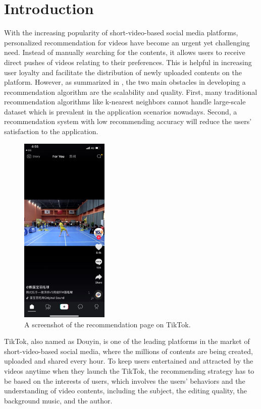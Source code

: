 \documentclass{article}
\begin{document}
\section{Introduction}
\label{sec:intro}

With the increasing popularity of short-video-based social media platforms, personalized recommendation for videos have become an urgent yet challenging need. Instead of manually searching for the contents, it allows users to receive direct pushes of videos relating to their preferences. This is helpful in increasing user loyalty and facilitate the distribution of newly uploaded contents on the platform.
However, as summarized in \cite{sarwar_item-based_2001}, the two main obstacles in developing a recommendation algorithm are the scalability and quality. First, many traditional recommendation algorithms like k-nearest neighbors cannot handle large-scale dataset which is prevalent in the application scenarios nowadays. Second, a recommendation system with low recommending accuracy will reduce the users' satisfaction to the application.

\begin{figure}[h]
  \centering
  \includegraphics[width=4.2cm]{media/tiktok}
  \caption{A screenshot of the recommendation page on TikTok.}
  \label{fig:tiktok}
\end{figure}

TikTok, also named as Douyin, is one of the leading platforms in the market of short-video-based social media, where the millions of contents are being created, uploaded and shared every hour. To keep users entertained and attracted by the videos anytime when they launch the TikTok, the recommending strategy has to be based on the interests of users, which involves the users' behaviors and the understanding of video contents, including the subject, the editing quality, the background music, and the author.
\end{document}
